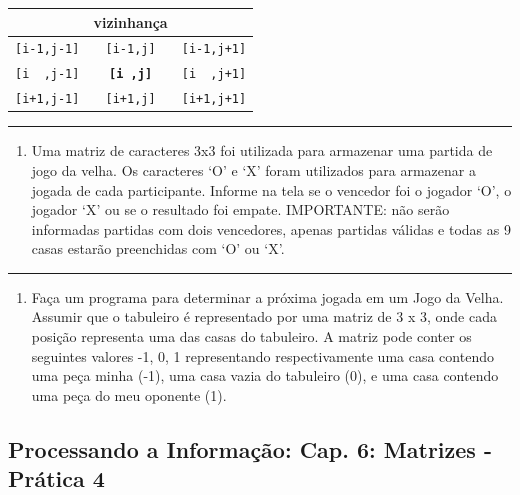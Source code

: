 \documentclass[12pt,a4paper]{article}
\renewcommand{\linethickness}{0.05em}
\providecommand{\tightlist}{%
      \setlength{\itemsep}{0pt}\setlength{\parskip}{0pt}}
\begin{document}
\begin{longtable}[]{@{}ccc@{}}
\toprule
& vizinhança &\tabularnewline
\midrule
\endhead
\texttt{{[}i-1,j-1{]}} & \texttt{{[}i-1,j{]}} &
\texttt{{[}i-1,j+1{]}}\tabularnewline
\texttt{{[}i\ \ ,j-1{]}} & \textbf{\texttt{{[}i\ ,j{]}}} &
\texttt{{[}i\ \ ,j+1{]}}\tabularnewline
\texttt{{[}i+1,j-1{]}} & \texttt{{[}i+1,j{]}} &
\texttt{{[}i+1,j+1{]}}\tabularnewline
\bottomrule
\end{longtable}

    \begin{center}\rule{0.5\linewidth}{\linethickness}\end{center}

\begin{enumerate}
\def\labelenumi{\arabic{enumi}.}
\setcounter{enumi}{6}
\tightlist
\item
  Uma matriz de caracteres 3x3 foi utilizada para armazenar uma partida
  de jogo da velha. Os caracteres `O' e `X' foram utilizados para
  armazenar a jogada de cada participante. Informe na tela se o vencedor
  foi o jogador `O', o jogador `X' ou se o resultado foi empate.
  IMPORTANTE: não serão informadas partidas com dois vencedores, apenas
  partidas válidas e todas as 9 casas estarão preenchidas com `O' ou
  `X'.
\end{enumerate}

    \begin{center}\rule{0.5\linewidth}{\linethickness}\end{center}

\begin{enumerate}
\def\labelenumi{\arabic{enumi}.}
\setcounter{enumi}{7}
\tightlist
\item
  Faça um programa para determinar a próxima jogada em um Jogo da Velha.
  Assumir que o tabuleiro é representado por uma matriz de 3 x 3, onde
  cada posição representa uma das casas do tabuleiro. A matriz pode
  conter os seguintes valores -1, 0, 1 representando respectivamente uma
  casa contendo uma peça minha (-1), uma casa vazia do tabuleiro (0), e
  uma casa contendo uma peça do meu oponente (1).
\end{enumerate}

    \hypertarget{processando-a-informauxe7uxe3o-cap.-6-matrizes---pruxe1tica-4}{%
\subsection{Processando a Informação: Cap. 6: Matrizes - Prática
4}\label{processando-a-informauxe7uxe3o-cap.-6-matrizes---pruxe1tica-4}}
\end{document}
